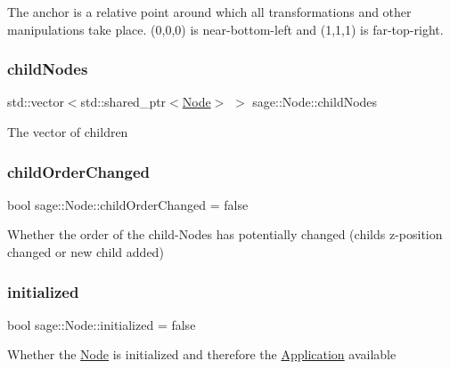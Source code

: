 The anchor is a relative point around which all transformations and other manipulations take place. (0,0,0) is near-\/bottom-\/left and (1,1,1) is far-\/top-\/right. \mbox{\label{classsage_1_1Node_a57b2d8693ad5b47016297be7a4c4e8c6}} 
\subsubsection{\texorpdfstring{childNodes}{childNodes}}
{\footnotesize\ttfamily std\+::vector$<$std\+::shared\+\_\+ptr$<$\mbox{\hyperlink{classsage_1_1Node}{Node}}$>$ $>$ sage\+::\+Node\+::child\+Nodes\hspace{0.3cm}{\ttfamily [protected]}}

The vector of children \mbox{\label{classsage_1_1Node_af78e7de5e455b1c64036f09a8889f51d}} 
\subsubsection{\texorpdfstring{childOrderChanged}{childOrderChanged}}
{\footnotesize\ttfamily bool sage\+::\+Node\+::child\+Order\+Changed = false\hspace{0.3cm}{\ttfamily [protected]}}

Whether the order of the child-\/\+Nodes has potentially changed (child\textquotesingle{}s z-\/position changed or new child added) \mbox{\label{classsage_1_1Node_a2c2cf2d54ee6a9368ece7ea46ad13deb}} 
\subsubsection{\texorpdfstring{initialized}{initialized}}
{\footnotesize\ttfamily bool sage\+::\+Node\+::initialized = false\hspace{0.3cm}{\ttfamily [protected]}}

Whether the \mbox{\hyperlink{classsage_1_1Node}{Node}} is initialized and therefore the \mbox{\hyperlink{classsage_1_1Application}{Application}} available \mbox{\label{classsage_1_1Node_a9f6d79896df762b8e8cff9574f1e9262}} 
